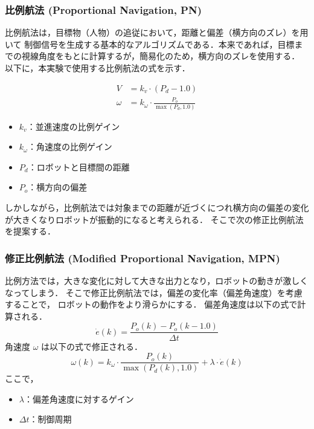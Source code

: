 \subsubsection{比例航法 (Proportional Navigation, PN)}
比例航法は，目標物（人物）の追従において，距離と偏差（横方向のズレ）を用いて
制御信号を生成する基本的なアルゴリズムである．本来であれば，目標までの視線角度をもとに計算するが，簡易化のため，横方向のズレを使用する．
以下に，本実験で使用する比例航法の式を示す．

\begin{align}
    V      & = k_v \cdot (P_d - 1.0)                     \\
    \omega & = k_\omega \cdot \frac{P_o}{\max(P_d, 1.0)}
\end{align}
\begin{itemize}
    \item \(k_v\)：並進速度の比例ゲイン
    \item \(k_\omega\)：角速度の比例ゲイン
    \item \(P_d\)：ロボットと目標間の距離
    \item \(P_o\)：横方向の偏差
\end{itemize}

しかしながら，比例航法では対象までの距離が近づくにつれ横方向の偏差の変化が大きくなりロボットが振動的になると考えられる．
そこで次の修正比例航法を提案する．

\subsubsection{修正比例航法 (Modified Proportional Navigation, MPN)}
比例方法では，大きな変化に対して大きな出力となり，ロボットの動きが激しくなってしまう．
そこで修正比例航法では，偏差の変化率（偏差角速度）を考慮することで，
ロボットの動作をより滑らかにする．
偏差角速度は以下の式で計算される．
\begin{equation}
    \dot{e}(k) = \frac{P_o(k) - P_o(k-1.0)}{\Delta t}
\end{equation}
角速度 \(\omega\) は以下の式で修正される．
\begin{equation}
    \omega(k) = k_\omega \cdot \frac{P_o(k)}{\max(P_d(k), 1.0)} + \lambda \cdot \dot{e}(k)
\end{equation}
ここで，
\begin{itemize}
    \item \(\lambda\)：偏差角速度に対するゲイン
    \item \(\Delta t\)：制御周期
\end{itemize}


